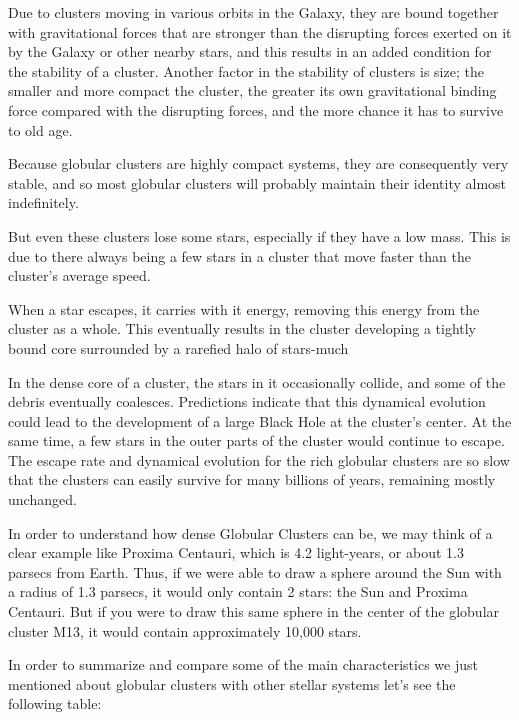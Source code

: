 Due to clusters moving in various orbits in the Galaxy, they are bound together with gravitational forces that are stronger than the disrupting forces exerted on it by the Galaxy or other nearby stars, and this results in an added condition for the stability of a cluster. Another factor in the stability of clusters is size; the smaller and more compact the cluster, the greater its own gravitational binding force compared with the disrupting forces, and the more chance it has to survive to old age.

Because globular clusters are highly compact systems, they are consequently very stable, and so most globular clusters will probably maintain their identity almost indefinitely.

But even these clusters lose some stars, especially if they have a low mass. This is due to there always being a few stars in a cluster that move faster than the cluster's average speed.

When a star escapes, it carries with it energy, removing this energy from the cluster as a whole. This eventually results in the cluster developing a tightly bound core surrounded by a rarefied halo of stars-much

In the dense core of a cluster, the stars in it occasionally collide, and some of the debris eventually coalesces. Predictions indicate that this dynamical evolution could lead to the development of a large Black Hole at the cluster's center. At the same time, a few stars in the outer parts of the cluster would continue to escape. The escape rate and dynamical evolution for the rich globular clusters are so slow that the clusters can easily survive for many billions of years, remaining mostly unchanged.

In order to understand how dense Globular Clusters can be, we may think of a clear example like Proxima Centauri, which is 4.2 light-years, or about 1.3 parsecs from Earth. Thus, if we were able to draw a sphere around the Sun with a radius of 1.3 parsecs, it would only contain 2 stars: the Sun and Proxima Centauri. But if you were to draw this same sphere in the center of the globular cluster M13, it would contain approximately 10,000 stars.

In order to summarize and compare some of the main characteristics we just mentioned about globular clusters with other stellar systems let's see the following table:

